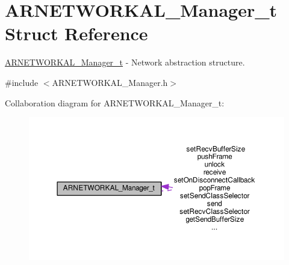 \hypertarget{struct_a_r_n_e_t_w_o_r_k_a_l___manager__t}{}\section{A\+R\+N\+E\+T\+W\+O\+R\+K\+A\+L\+\_\+\+Manager\+\_\+t Struct Reference}
\label{struct_a_r_n_e_t_w_o_r_k_a_l___manager__t}


\hyperlink{struct_a_r_n_e_t_w_o_r_k_a_l___manager__t}{A\+R\+N\+E\+T\+W\+O\+R\+K\+A\+L\+\_\+\+Manager\+\_\+t} -\/ Network abstraction structure.  




{\ttfamily \#include $<$A\+R\+N\+E\+T\+W\+O\+R\+K\+A\+L\+\_\+\+Manager.\+h$>$}



Collaboration diagram for A\+R\+N\+E\+T\+W\+O\+R\+K\+A\+L\+\_\+\+Manager\+\_\+t\+:
\nopagebreak
\begin{figure}[H]
\begin{center}
\leavevmode
\includegraphics[width=350pt]{struct_a_r_n_e_t_w_o_r_k_a_l___manager__t__coll__graph}
\end{center}
\end{figure}
